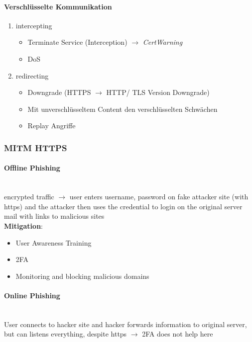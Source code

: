 \paragraph{Verschlüsselte Kommunikation}
\begin{enumerate}
    \item intercepting
    \begin{itemize}
        \item Terminate Service (Interception) $\rightarrow$ \textit{CertWarning}
        \item DoS
    \end{itemize}
    \item redirecting
    \begin{itemize}
        \item Downgrade (HTTPS $\rightarrow$ HTTP/ TLS Version Downgrade)
        \item Mit unverschlüsseltem Content den verschlüsselten Schwächen
        \item Replay Angriffe
    \end{itemize}
\end{enumerate}

\subsubsection{MITM HTTPS}
\paragraph{Offline Phishing}\mbox{} \\
encrypted traffic $\rightarrow$ user enters username, password on fake attacker site (with https) and the attacker then uses the credential to login on the original server mail with links to malicious sites\\

\textbf{Mitigation}:
\begin{itemize}
    \item User Awareness Training
    \item 2FA
    \item Monitoring and blocking malicious domains
\end{itemize}

\paragraph{Online Phishing}\mbox{} \\
User connects to hacker site and hacker forwards information to original server, but can listens everything, despite https $\rightarrow$ 2FA does not help here\\

